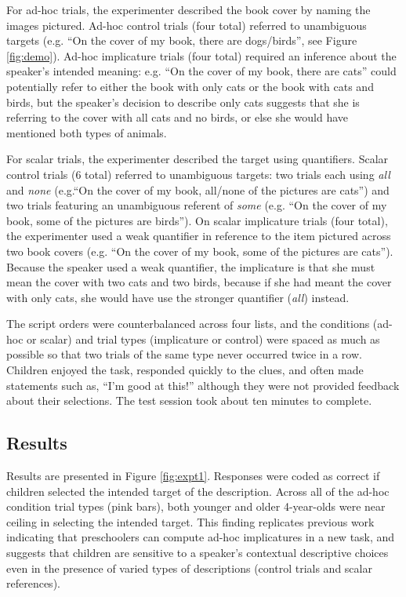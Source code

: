 \documentclass[10pt,letterpaper]{article}
\begin{document}
For ad-hoc trials, the experimenter described the book cover by naming the images pictured. Ad-hoc control trials (four total) referred to unambiguous targets (e.g. ``On the cover of my book, there are dogs/birds'', see Figure \ref{fig:demo}).  Ad-hoc implicature trials (four total) required an inference about the speaker's intended meaning: e.g. ``On the cover of my book, there are cats'' could potentially refer to either the book with only cats or the book with cats and birds, but the speaker's decision to describe only cats suggests that she is referring to the cover with all cats and no birds, or else she would have mentioned both types of animals. 

For scalar trials, the experimenter described the target using quantifiers. Scalar control trials (6 total) referred to unambiguous targets: two trials each using \emph{all} and \emph{none} (e.g.``On the cover of my book, all/none of the pictures are cats'') and two trials featuring an unambiguous referent of \emph{some} (e.g. ``On the cover of my book, some of the pictures are birds'').  On scalar implicature trials (four total), the experimenter used a weak quantifier in reference to the item pictured across two book covers (e.g. ``On the cover of my book, some of the pictures are cats''). Because the speaker used a weak quantifier, the implicature is that she must mean the cover with two cats and two birds, because if she had meant the cover with only cats, she would have use the stronger quantifier (\emph{all}) instead. 

The script orders were counterbalanced across four lists, and the conditions (ad-hoc or scalar) and trial types (implicature or control) were spaced as much as possible so that two trials of the same type never occurred twice in a row. Children enjoyed the task, responded quickly to the clues, and often made statements such as, ``I'm good at this!'' although they were not provided feedback about their selections. The test session took about ten minutes to complete.

\subsection{Results}


Results are presented in Figure \ref{fig:expt1}. Responses were coded as correct if children selected the intended target of the description. Across all of the ad-hoc condition trial types (pink bars), both younger and older 4-year-olds were near ceiling in selecting the intended target. This finding replicates previous work indicating that preschoolers can compute ad-hoc implicatures \citep{stiller2014} in a new task, and suggests that children are sensitive to a speaker's contextual descriptive choices even in the presence of varied types of descriptions (control trials and scalar references). 
\end{document}
